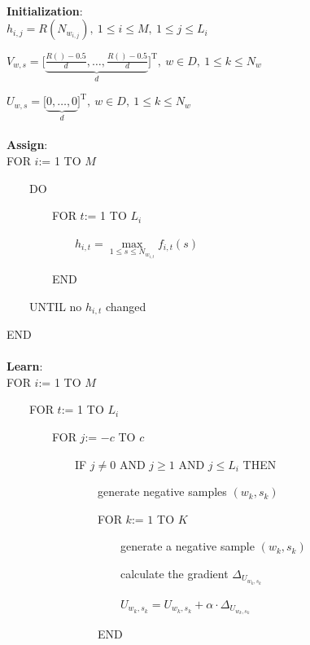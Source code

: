 \documentclass[12pt,a4paper,twoside]{book}
\begin{document}
\paragraph{} \textbf{Initialization}: \\

$h_{i,j} = R(N_{w_{i,j}}),  \ 1\leq i \leq M,  \ 1\leq j\leq L_i$

$V_{w,s} = \Big[\underbrace{\frac{R()-0.5}{d},\ldots,\frac{R()-0.5}{d}}_{d}\Big]^{\mathrm{T}}, \ w\in D, \  1\leq k\leq N_w$

$U_{w,s} = \Big[\underbrace{0,\ldots,0}_{d}\Big]^{\mathrm{T}},  \ w\in D, \  1\leq k\leq N_w$
\paragraph{} \textbf{Assign}:\\

FOR $i$:= 1 TO $M$

\ \ \ \ DO

\ \ \ \ \ \ \ \ FOR $t$:= 1 TO $L_i$

\ \ \ \ \ \ \ \ \ \ \ \ $h_{i,t} = \max\limits_{1\leq s\leq N_{w_{i,t}}} f_{i,t}(s)$

\ \ \ \ \ \ \ \ END

\ \ \ \ UNTIL no $h_{i,t}$ changed

END
\paragraph{} \textbf{Learn}:\\

FOR $i$:= 1 TO $M$

\ \ \ \ FOR $t$:= 1 TO $L_i$

\ \ \ \ \ \ \ \ FOR $j$:= $-c$ TO $c$

\ \ \ \ \ \ \ \ \ \ \ \ IF $j\neq 0$ AND $j\geq1$ AND $j\leq L_i$ THEN

\ \ \ \ \ \ \ \ \ \ \ \ \ \ \ \ generate negative samples $(w_k,s_k)$

\ \ \ \ \ \ \ \ \ \ \ \ \ \ \ \ FOR $k$:= $1$ TO $K$

\ \ \ \ \ \ \ \ \ \ \ \ \ \ \ \ \ \ \ \ generate a negative sample $(w_k,s_k)$

\ \ \ \ \ \ \ \ \ \ \ \ \ \ \ \ \ \ \ \ calculate the gradient $\Delta_{U_{w_k,s_k}}$

\ \ \ \ \ \ \ \ \ \ \ \ \ \ \ \ \ \ \ \ $U_{w_k,s_k} = U_{w_k,s_k} + \alpha \cdot \Delta_{U_{w_k,s_k}} $

\ \ \ \ \ \ \ \ \ \ \ \ \ \ \ \ END
 
\end{document}
